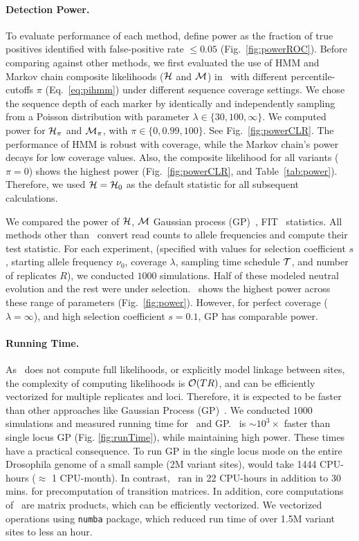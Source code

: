 \documentclass[11pt]{article}
\def\comale{\text{{\sc Comale}}}
\begin{document}
\paragraph{Detection Power.} 
To evaluate performance of each method, define power as the fraction
of true positives identified with false-positive rate $\le 0.05$
(Fig.~\ref{fig:powerROC}). Before comparing against other methods, we
first evaluated the use of HMM and Markov chain composite likelihoods
(${\cal H}$ and ${\cal M}$) in \comale\ with different percentile-cutoffs $\pi$
(Eq.~\ref{eq:pihmm}) under different sequence coverage settings. We
chose the sequence depth of each marker by identically and
independently sampling from a Poisson distribution with parameter
$\lambda\in \{30,100,\infty\}$. We computed power for ${\cal H}_\pi$
and ${\cal M}_{\pi}$, with $\pi \in \{0,0.99,100\}$. See
Fig.~\ref{fig:powerCLR}. The performance of HMM is robust with
coverage, while the Markov chain's power decays for low coverage
values. Also, the composite likelihood for all variants ($\pi=0$)
shows the highest power (Fig.~\ref{fig:powerCLR}, and
Table~\ref{tab:power}).  Therefore, we used ${\cal H} = {\cal H}_0$ as
the default statistic for all subsequent calculations.

We compared the power of ${\cal H}$, ${\cal M}$ Gaussian process
(GP)~\cite{Terhorst2015Multi}, FIT~\cite{feder2014Identifying}
statistics.  All methods other than \comale\ convert read counts to
allele frequencies and compute their test statistic. For each
experiment, (specified with values for selection coefficient $s$,
starting allele frequency $\nu_0$, coverage $\lambda$, sampling time
schedule ${\cal T}$, and number of replicates $R$), we conducted
$1000$ simulations. Half of these modeled neutral evolution and the
rest were under selection. \comale\ shows the highest power across
these range of parameters (Fig.~\ref{fig:power}). However, for perfect
coverage ($\lambda=\infty$), and high selection coefficient $s=0.1$,
GP has comparable power.




\paragraph{Running Time.}
As \comale\ does not compute full likelihoods, or explicitly model
linkage between sites, the complexity of computing likelihoods is
${\cal O}(TR)$, and can be efficiently vectorized for multiple replicates
and loci. Therefore, it is expected to be faster than other approaches
like Gaussian Process (GP)~\cite{Terhorst2015Multi}. We conducted
$1000$ simulations and measured running time for \comale\ and
GP. \comale\ is $\sim 10^3\times$ faster than single locus GP (Fig.
\ref{fig:runTime}), while maintaining high power. These times have a
practical consequence. To run GP in the single locus mode on the
entire Drosophila genome of a small sample (2M variant sites), would
take 1444 CPU-hours ($\approx$ 1 CPU-month). In contrast, \comale\ ran
in 22 CPU-hours in addition to 30 mins. for precomputation of
transition matrices.  In addition, core computations of \comale\ are
matrix products, which can be efficiently vectorized. We vectorized
operations using \texttt{numba} package, which reduced run time of
over 1.5M variant sites to less an hour.
\end{document}
